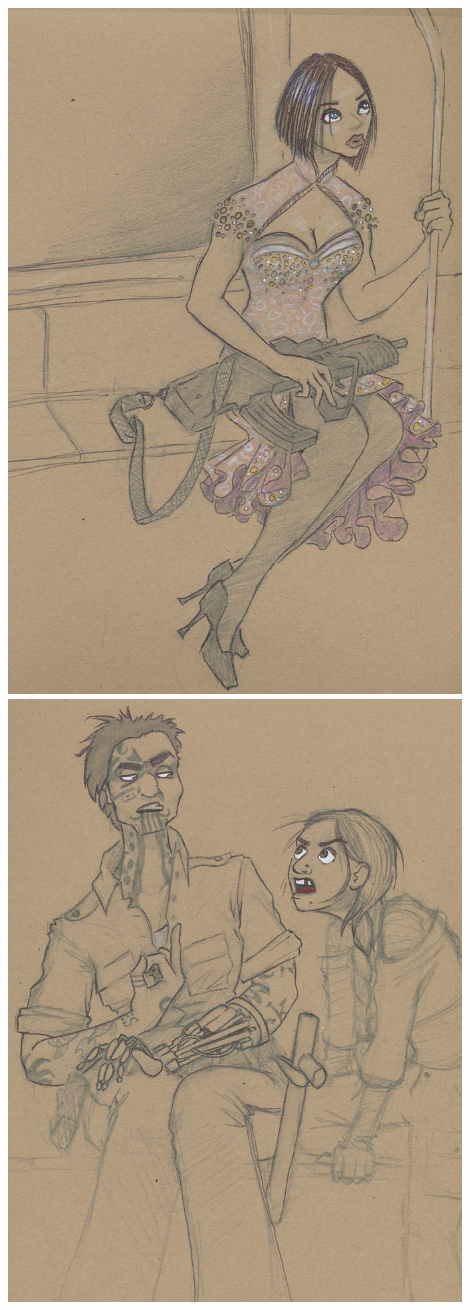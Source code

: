 \begin{center}
\includegraphics[width=12cm]{img/ch32_hayley_dress.jpg}
\includegraphics[width=12cm]{img/ch32_jaya_and_riva.jpg}
\end{center}